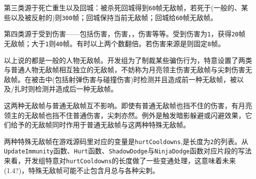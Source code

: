 第三类源于死亡重生以及回城：被杀死回城得到\lstinline{60}帧无敌帧，若死于(一般的、某些以及被反射的)则\lstinline{300}帧；回城保持当前无敌帧；回城给\lstinline{60}帧无敌帧。

第四类源于受到伤害——包括伤害，伤害，，伤害等等。受到伤害为\lstinline{1}，获得\lstinline{20}帧无敌帧；大于\lstinline{1}则\lstinline{40}帧。有时以上两个数翻倍。若伤害来源是则固定\lstinline{8}帧。

以上说的都是一般的人物无敌帧。开发组为了制裁某些骗伤行为，特意设置了两类与普通人物无敌帧相互独立的无敌帧，不妨称为月亮领主伤害无敌帧与尖刺伤害无敌帧。在被击中(包括射弹伤害与碰撞伤害)时检测并且造成前一种无敌帧，被以及/扎时则检测并造成后一种无敌帧。

这两种无敌帧与普通无敌帧互不影响。即使有普通无敌帧也挡不住的伤害，有月亮领主的无敌帧也挡不住普通伤害，尖刺亦然。例外是触发暗影躲避或闪避效果，它们给予的无敌帧同时作用于普通无敌帧与这两种特殊无敌帧。

两种特殊无敌帧在游戏源码里对应的变量是\lstinline{hurtCooldowns},是长度为\lstinline{2}的列表。从\lstinline{UpdateImmunity}函数、\lstinline{Hurt}函数、\lstinline{ShadowDodge}与\lstinline{NinjaDodge}函数对应片段的写法来看，开发组特意对\lstinline{hurtCooldowns}的长度做了一些变通处理，这意味着未来(1.4?)，特殊无敌帧可能不止包含月总与各种尖刺。
